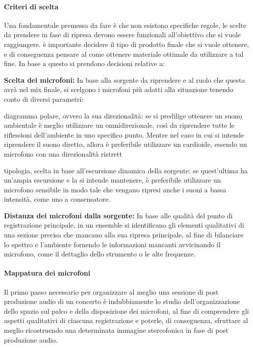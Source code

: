 	\paragraph{Criteri di scelta}
	Una fondamentale premessa da fare è che non esistono specifiche regole, le scelte da prendere in fase di ripresa devono essere funzionali all'obiettivo che si vuole raggiungere. è importante decidere il tipo di prodotto finale che si vuole ottenere, e di conseguenza pensare al come ottenere materiale ottimale da utilizzare a tal fine. In base a questo si prendono decisioni relative a:
	
	\begin{compactitem}
		\item \textbf{Scelta dei microfoni:} In base alla sorgente da riprendere e al ruolo che questa avrà nel mix finale, si scelgono i microfoni più adatti alla situazione tenendo conto di diversi parametri:
			\begin{compactitem}
				\item diagramma polare, ovvero la sua direzionalità: se si predilige ottenere un suono ambientale è meglio utilizzare un omnidirezionale, così da riprendere tutte le riflessioni dell'ambiente in uno specifico punto. Mentre nel caso in cui si intende riprendere il suono diretto, allora è preferibile utilizzare un cardioide, essendo un microfono con una direzionalità ristrett
				\item tipologia, scelta in base all'escursione dinamica della sorgente: se quest'ultima ha un'ampia escursione e la si intende mantenere, è preferibile utilizzare un microfono sensibile in modo tale che vengano ripresi anche i suoni a bassa intensità, come uno a consensatore.
			\end{compactitem}
		\item \textbf{Distanza dei microfoni dalla sorgente:} In base alle qualità del punto di registrazione principale, in un ensemble si identificano gli elementi qualitativi di una sezione precisa che mancano alla sua ripresa principale, al fine di bilanciare lo spettro e l'ambiente fornendo le informazioni mancanti avvicinando il microfono, come il dettaglio dello strumento o le alte frequenze.
	\end{compactitem}
	
	\paragraph{Mappatura dei microfoni}
	Il primo passo necessario per organizzare al meglio una sessione di post produzione audio di un concerto è indubbiamente lo studio dell'organizzazione dello spazio sul palco e della disposizione dei microfoni, al fine di comprendere gli aspetti qualitativi di ciascuna registrazione e poterle, di conseguenza, sfruttare al meglio ricostruendo una determinata immagine stereofonica in fase di post produzione audio.

